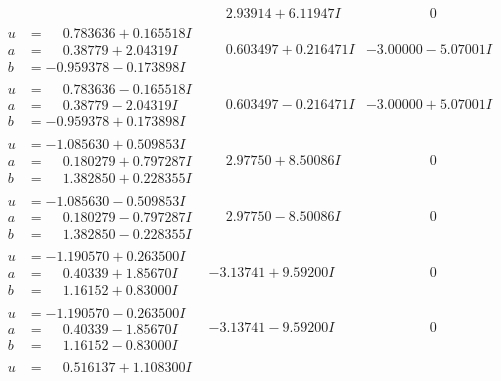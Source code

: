 \documentclass[1p]{elsarticle_modified}
\theoremstyle{definition}
\begin{document}
$$\begin{array}{c|c|c}
 & \phantom{-}2.93914 + 6.11947 I & \phantom{-0.000000 } 0 \\ \hline\begin{aligned}
u &= \phantom{-}0.783636 + 0.165518 I \\
a &= \phantom{-}0.38779 + 2.04319 I \\
b &= -0.959378 - 0.173898 I\end{aligned}
 & \phantom{-}0.603497 + 0.216471 I & -3.00000 - 5.07001 I \\ \hline\begin{aligned}
u &= \phantom{-}0.783636 - 0.165518 I \\
a &= \phantom{-}0.38779 - 2.04319 I \\
b &= -0.959378 + 0.173898 I\end{aligned}
 & \phantom{-}0.603497 - 0.216471 I & -3.00000 + 5.07001 I \\ \hline\begin{aligned}
u &= -1.085630 + 0.509853 I \\
a &= \phantom{-}0.180279 + 0.797287 I \\
b &= \phantom{-}1.382850 + 0.228355 I\end{aligned}
 & \phantom{-}2.97750 + 8.50086 I & \phantom{-0.000000 } 0 \\ \hline\begin{aligned}
u &= -1.085630 - 0.509853 I \\
a &= \phantom{-}0.180279 - 0.797287 I \\
b &= \phantom{-}1.382850 - 0.228355 I\end{aligned}
 & \phantom{-}2.97750 - 8.50086 I & \phantom{-0.000000 } 0 \\ \hline\begin{aligned}
u &= -1.190570 + 0.263500 I \\
a &= \phantom{-}0.40339 + 1.85670 I \\
b &= \phantom{-}1.16152 + 0.83000 I\end{aligned}
 & -3.13741 + 9.59200 I & \phantom{-0.000000 } 0 \\ \hline\begin{aligned}
u &= -1.190570 - 0.263500 I \\
a &= \phantom{-}0.40339 - 1.85670 I \\
b &= \phantom{-}1.16152 - 0.83000 I\end{aligned}
 & -3.13741 - 9.59200 I & \phantom{-0.000000 } 0 \\ \hline\begin{aligned}
u &= \phantom{-}0.516137 + 1.108300 I \\

\end{aligned}
\end{array}$$
\end{document}
